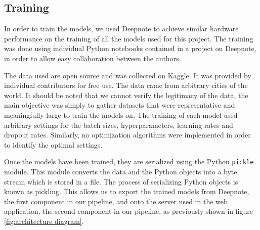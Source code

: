 \subsection{Training}\label{sec:training}
In order to train the models, we used Deepnote\cite{deepnote} to achieve similar hardware performance on the training of all the models used for this project. 
The training was done using individual Python notebooks contained in a project on Deepnote, in order to allow easy collaboration between the authors.

The data used are open source and was collected on Kaggle\cite{kaggle}. It was provided by individual contributors for free use.
The data came from arbitrary cities of the world. 
It should be noted that we cannot verify the legitimacy of the data, the main objective was simply to gather datasets that were representative and meaningfully large to train the models on. 
The training of each model used arbitrary settings for the batch sizes, hyperparameters, learning rates and dropout rates. Similarly, no optimization algorithms were implemented in order to identify the optimal settings. 

Once the models have been trained, they are serialized using the Python \texttt{pickle} module.
This module converts the data and the Python objects into a byte stream which is stored in a file.
The process of serializing Python objects is known as pickling. 
This allows us to export the trained models from Deepnote, the first component in our pipeline, and onto the server used in the web application, the second component in our pipeline, as previously shown in figure \ref{fig:architecture diagram}.\cite{pickle_documentation}